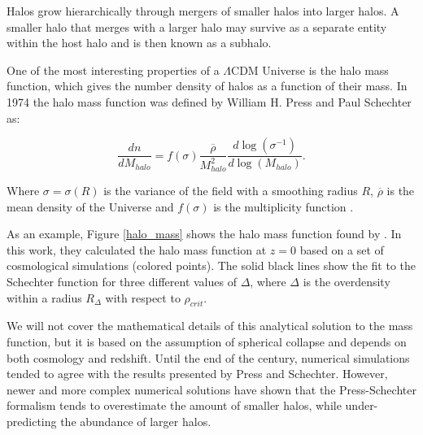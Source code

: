 Halos grow hierarchically through mergers of smaller halos into larger halos. A smaller halo that merges with a larger halo may survive as a separate entity within the host halo and is then known as a subhalo. 

One of the most interesting properties of a $\Lambda$CDM Universe is the halo mass function, which gives the number density of halos as a function of their mass. In 1974 the halo mass function was defined by William H. Press and Paul Schechter as:

\begin{equation}
    \frac{dn}{dM_{halo}} = f(\sigma)\frac{\overline{\rho}}{M_{halo}^2}\frac{d\log(\sigma^{-1})}{d\log(M_{halo})}.
\end{equation}

Where $\sigma = \sigma (R)$ is the variance of the field with a smoothing radius $R$, $\overline{\rho}$ is the mean density of the Universe and $f(\sigma)$ is the multiplicity function \parencite{Press1974}. 

As an example, Figure \ref{halo_mass} shows the halo mass function found by \textcite{Tinker2008}. In this work, they calculated the halo mass function at $z=0$ based on a set of cosmological simulations (colored points). The solid black lines show the fit to the Schechter function for three different values of $\Delta$, where $\Delta$ is the overdensity within a radius $R_{\Delta}$ with respect to $\rho_{crit}$.

We will not cover the mathematical details of this analytical solution to the mass function, but it is based on the assumption of spherical collapse and depends on both cosmology and redshift.
Until the end of the century, numerical simulations tended to agree with the results presented by Press and Schechter. However, newer and more complex numerical solutions have shown that the Press-Schechter formalism tends to overestimate the amount of smaller halos, while under-predicting the abundance of larger halos.

